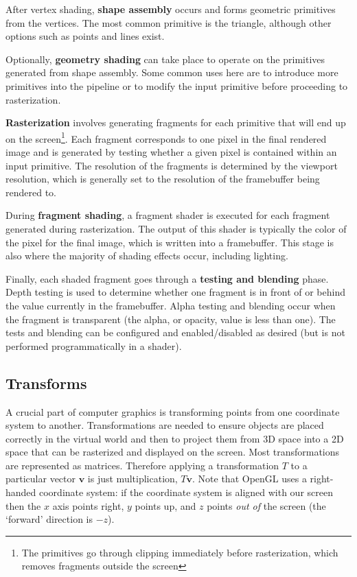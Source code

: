 After vertex shading, \textbf{shape assembly} occurs and forms geometric primitives from the vertices. The most common primitive is the triangle, although other options such as points and lines exist.

Optionally, \textbf{geometry shading} can take place to operate on the primitives generated from shape assembly. Some common uses here are to introduce more primitives into the pipeline or to modify the input primitive before proceeding to rasterization.

\textbf{Rasterization} involves generating fragments for each primitive that will end up on the screen\footnote{The primitives go through clipping immediately before rasterization, which removes fragments outside the screen}. Each fragment corresponds to one pixel in the final rendered image and is generated by testing whether a given pixel is contained within an input primitive. The resolution of the fragments is determined by the viewport resolution, which is generally set to the resolution of the framebuffer being rendered to.

During \textbf{fragment shading}, a fragment shader is executed for each fragment generated during rasterization. The output of this shader is typically the color of the pixel for the final image, which is written into a framebuffer. This stage is also where the majority of shading effects occur, including lighting.

Finally, each shaded fragment goes through a \textbf{testing and blending} phase. Depth testing is used to determine whether one fragment is in front of or behind the value currently in the framebuffer. Alpha testing and blending occur when the fragment is transparent (the alpha, or opacity, value is less than one). The tests and blending can be configured and enabled/disabled as desired (but is not performed programmatically in a shader).

\subsection{Transforms}
A crucial part of computer graphics is transforming points from one coordinate system to another. Transformations are needed to ensure objects are placed correctly in the virtual world and then to project them from 3D space into a 2D space that can be rasterized and displayed on the screen. Most transformations are represented as matrices. Therefore applying a transformation $T$ to a particular vector $\bm{v}$ is just multiplication, $T \bm{v}$. Note that OpenGL uses a right-handed coordinate system: if the coordinate system is aligned with our screen then the $x$ axis points right, $y$ points up, and $z$ points \textit{out of} the screen (the `forward' direction is $-z$).

